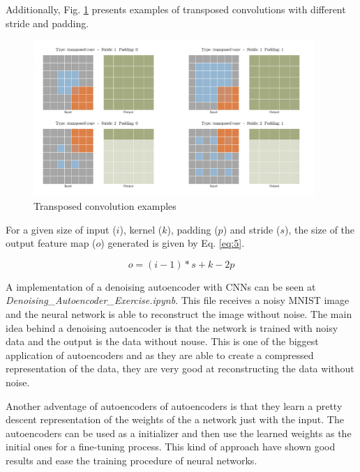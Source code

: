 \documentclass{article}
\begin{document}
Additionally, Fig. \ref{fig:f8} presents examples of transposed convolutions with different stride and padding.

\begin{figure}[ht]
    \centering
    \includegraphics[width=0.95\textwidth,height=0.95\textheight,keepaspectratio]{images/multiple_convs.png}
    \captionsetup{justification=centering}
    \caption{Transposed convolution examples}
    \label{fig:f8}
\end{figure}

For a given size of input (\(i\)), kernel (\(k\)), padding (\(p\)) and stride (\(s\)), the size of the output feature map (\(o\)) generated is given by  Eq. \eqref{eq:5}.

\begin{equation}
o = (i - 1) * s + k - 2p
\label{eq:5}
\end{equation}

A implementation of a denoising autoencoder with CNNs can be seen at \textit{Denoising\_Autoencoder\_Exercise.ipynb}. This file receives a noisy MNIST image and the neural network is able to reconstruct the image without noise. The main idea behind a denoising autoencoder is that the network is trained with noisy data and the output is the data without nouse. This is one of the biggest application of autoencoders and as they are able to create a compressed representation of the data, they are very good at reconstructing the data without noise.

Another adventage of autoencoders of autoencoders is that they learn a pretty descent representation of the weights of the a network just with the input. The autoencoders can be used as a initializer and then use the learned weights as the initial ones for a fine-tuning process. This kind of approach have shown good results and ease the training procedure of neural networks.

\printbibliography
\end{document}
